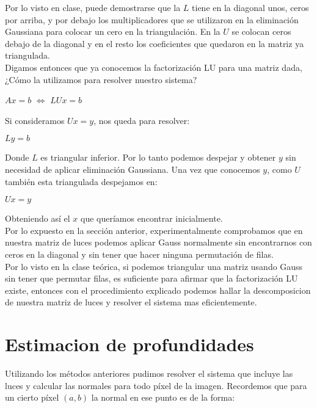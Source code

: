 Por lo visto en clase, puede demostrarse que la $L$ tiene en la diagonal unos, ceros por arriba, y por debajo los multiplicadores que se utilizaron en la eliminación Gaussiana para colocar un cero en la triangulación. En la $U$ se colocan ceros debajo de la diagonal y en el resto los coeficientes que quedaron en la matriz ya triangulada. \\

Digamos entonces que ya conocemos la factorización LU para una matriz dada, ¿Cómo la utilizamos para resolver nuestro sistema?

\begin{center}
    $Ax = b$ $\iff$ $LUx = b$
\end{center}

Si consideramos $Ux = y$, nos queda para resolver:

\begin{center}
    $Ly = b$
\end{center}

Donde $L$ es triangular inferior. Por lo tanto podemos despejar y obtener $y$ sin necesidad de aplicar eliminación Gaussiana. Una vez que conocemos $y$, como $U$ también esta triangulada despejamos en:

\begin{center}
    $Ux = y$
\end{center}

Obteniendo así el $x$ que queríamos encontrar inicialmente. \\

Por lo expuesto en la sección anterior, experimentalmente comprobamos que en nuestra matriz de luces podemos aplicar Gauss normalmente sin encontrarnos con ceros en la diagonal y sin tener que hacer ninguna permutación de filas. \\

Por lo visto en la clase teórica, si podemos triangular una matriz usando Gauss sin tener que permutar filas, es suficiente para afirmar que la factorización LU existe, entonces con el procedimiento explicado podemos hallar la descomposicion de nuestra matriz de luces y resolver el sistema mas eficientemente. \\

\newpage
\section{Estimacion de profundidades}

Utilizando los métodos anteriores pudimos resolver el sistema que incluye las luces y calcular las normales para todo píxel de la imagen. Recordemos que para un cierto píxel $(a, b)$ la normal en ese punto es de la forma:

